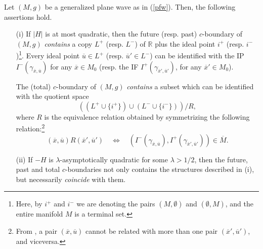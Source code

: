 \begin{theorem}\label{t} Let $(M,g)$ be a generalized plane wave as in (\ref{pfw}). Then, the following assertions hold.
\begin{itemize}
\item[(i)] If $|H|$ is at most quadratic, then the future (resp. past) $c$-boundary of $(M,g)$ {\em contains} a
copy $L^+$ (resp. $L^-$) of ${\mathbb R}$ plus the ideal point $i^+$ (resp. $i^-$)\footnote{Here, by $i^{+}$ and $i^{-}$ we are denoting the pairs $(M,\emptyset)$ and $(\emptyset,M)$, and the entire manifold $M$ is a terminal set.}. Every ideal point $\overline{u}\in L^{+}$ (resp. $\overline{u}'\in L^{-}$) can be identified with the IP $I^{-}(\gamma_{\overline{x},\overline{u}})$ for any $\overline{x}\in M_0$ (resp. the IF $I^{+}(\gamma_{\overline{x}',\overline{u}'})$, for any $\overline{x}'\in M_0$).

    The (total) $c$-boundary of $(M,g)$ {\em contains} a subset which can be identified with the quotient space $$((L^{+}\cup \{i^{+}\})\cup (L^{-}\cup \{i^{-}\}))/R,$$ where $R$ is the equivalence relation obtained by symmetrizing the following relation:\footnote{From \cite[Remark 7.10]{Florescausalboundarywavetype2008}, a pair $(\overline{x},\overline{u})$ cannot be related with more than one pair $(\overline{x}',\overline{u}')$, and viceversa.}
    \[
    (\overline{x},\overline{u})R(\overline{x}',\overline{u}')\quad\Leftrightarrow\quad (I^{-}(\gamma_{\overline{x},\overline{u}}),I^{+}(\gamma_{\overline{x}',\overline{u}'}))\in\overline{M}.
    \]

\item[(ii)] If $-H$ is $\lambda$-asymptotically quadratic for some
$\lambda>1/2$, then the future, past and total $c$-boundaries not only contains the structures described in (i), but necessarily {\em coincide} with them.



\end{itemize}
\end{theorem}
